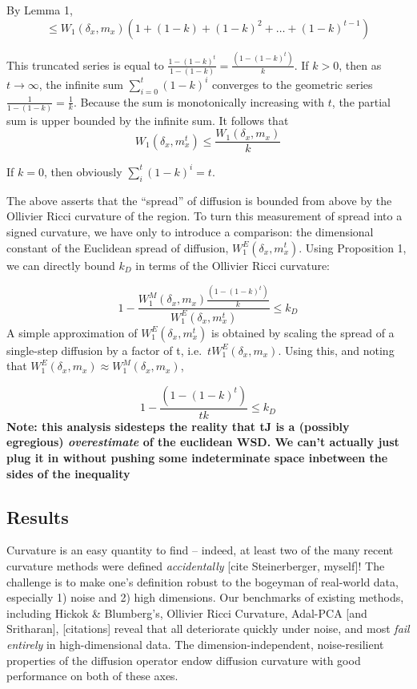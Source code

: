 \documentclass[
  letterpaper,
  DIV=11,
  numbers=noendperiod]{scrartcl}
\begin{document}
By Lemma 1, \[
\leq W_1\left(\delta_x,m_x\right)\left(1+(1-k)+(1-k)^2+\ldots+(1-k)^{t-1}\right)
\]

This truncated series is equal to
\(\frac{1-(1-k)^t}{1-(1-k)} = \frac{(1-(1-k)^t)}{k}\). If \(k>0\), then
as \(t \to \infty\), the infinite sum \(\sum_{i=0}^t (1-k)^i\) converges
to the geometric series \(\frac{1}{1-(1-k)} = \frac{1}{k}\). Because the
sum is monotonically increasing with \(t\), the partial sum is upper
bounded by the infinite sum. It follows that \[
W_{1}(\delta_{x},m_{x}^t) \leq \frac{W_1\left(\delta_x,m_x\right)}{k}
\]

If \(k=0\), then obviously \(\sum_{i}^t (1-k)^i = t\).

The above asserts that the ``spread'' of diffusion is bounded from above
by the Ollivier Ricci curvature of the region. To turn this measurement
of spread into a signed curvature, we have only to introduce a
comparison: the dimensional constant of the Euclidean spread of
diffusion, \(W_{1}^E(\delta_{x},m_{x}^t)\). Using Proposition 1, we can
directly bound \(k_{D}\) in terms of the Ollivier Ricci curvature:

\[
1 - \frac{W^M_1\left(\delta_x,m_x\right)\frac{(1-(1-k)^t)}{k}}{W_{1}^E(\delta_{x},m_{x}^t)} \leq k_{D}
\] A simple approximation of \(W_{1}^E(\delta_{x},m_{x}^t)\) is obtained
by scaling the spread of a single-step diffusion by a factor of t,
i.e.~\(tW_{1}^E(\delta_{x},m_{x})\). Using this, and noting that
\(W_{1}^E(\delta_{x},m_{x}) \approx W_{1}^M(\delta_{x},m_{x})\),

\[
1 - \frac{(1-(1-k)^t)}{tk} \leq k_{D}
\] \textbf{Note: this analysis sidesteps the reality that tJ is a
(possibly egregious) \emph{overestimate} of the euclidean WSD. We can't
actually just plug it in without pushing some indeterminate space
inbetween the sides of the inequality}

\subsection{Results}\label{results}

Curvature is an easy quantity to find -- indeed, at least two of the
many recent curvature methods were defined \emph{accidentally} {[}cite
Steinerberger, myself{]}! The challenge is to make one's definition
robust to the bogeyman of real-world data, especially 1) noise and 2)
high dimensions. Our benchmarks of existing methods, including Hickok \&
Blumberg's, Ollivier Ricci Curvature, Adal-PCA {[}and Sritharan{]},
{[}citations{]} reveal that all deteriorate quickly under noise, and
most \emph{fail entirely} in high-dimensional data. The
dimension-independent, noise-resilient properties of the diffusion
operator endow diffusion curvature with good performance on both of
these axes.
\end{document}

